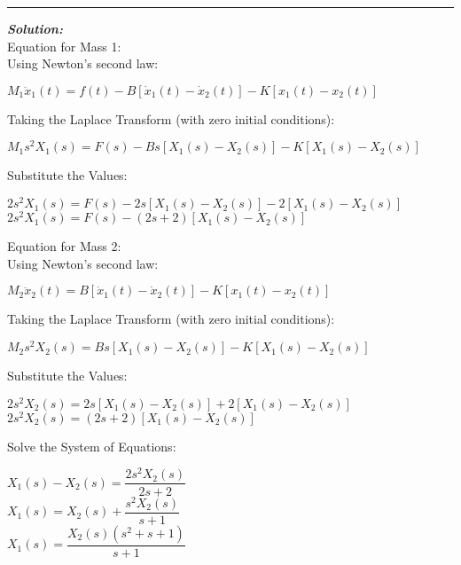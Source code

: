 \documentclass[11pt,letterpaper]{article}
\begin{document}
\rule{\textwidth}{1pt}
\vspace{12pt}
\textit{\textbf{Solution:}}\\
Equation for Mass 1:\\[12pt]
Using Newton's second law:\\
\begin{center}
	$M_1\ddot{x}_1(t)=f(t)-B[\dot{x}_1(t)-\dot{x}_2(t)]-K[x_1(t)-x_2(t)]$\\
\end{center}
Taking the Laplace Transform (with zero initial conditions):\\
\begin{center}
	$M_1s^2X_1(s)=F(s)-Bs[X_1(s)-X_2(s)]-K[X_1(s)-X_2(s)]$\\
\end{center}
Substitute the Values:\\
\begin{center}
	$2s^2X_1(s)=F(s)-2s[X_1(s)-X_2(s)]-2[X_1(s)-X_2(s)]$\\[12pt]
	$2s^2X_1(s)=F(s)-(2s+2)[X_1(s)-X_2(s)]$\\[12pt]
\end{center}
Equation for Mass 2:\\[12pt]
Using Newton's second law:\\
\begin{center}
	$M_2\ddot{x}_2(t)=B[\dot{x}_1(t)-\dot{x}_2(t)]-K[x_1(t)-x_2(t)]$\\
\end{center}
Taking the Laplace Transform (with zero initial conditions):\\
\begin{center}
	$M_2s^2X_2(s)=Bs[X_1(s)-X_2(s)]-K[X_1(s)-X_2(s)]$\\
\end{center}
Substitute the Values:\\
\begin{center}
	$2s^2X_2(s)=2s[X_1(s)-X_2(s)]+2[X_1(s)-X_2(s)]$\\[12pt]
	$2s^2X_2(s)=(2s+2)[X_1(s)-X_2(s)]$\\[12pt]
\end{center}
Solve the System of Equations:\\
\begin{center}
	$X_1(s)-X_2(s)=\dfrac{2s^2X_2(s)}{2s+2}$\\[12pt]
	$X_1(s)=X_2(s)+\dfrac{s^2X_2(s)}{s+1}$\\[12pt]
	$X_1(s)=\dfrac{X_2(s)(s^2+s+1)}{s+1}$\\[12pt]
\end{center}
\end{document}
